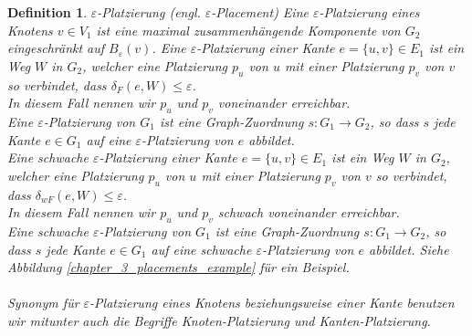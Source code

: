 \documentclass[a4paper, 12pt, twoside]{article}
\theoremstyle{Format1} %
\newtheorem{Def}{Definition}[section]       %
\begin{document}
\begin{Def}
	$\varepsilon$-Platzierung (engl. $\varepsilon$-Placement)
	Eine \textit{$\varepsilon$-Platzierung eines Knotens $v \in V_1$} ist eine maximal zusammenhängende Komponente von $G_2$ eingeschränkt auf $B_{\varepsilon}(v)$.
	Eine \textit{$\varepsilon$-Platzierung einer Kante $e = \{u,v\} \in E_1$} ist ein Weg $W$ in $G_2$, welcher eine Platzierung $p_u$ von $u$ mit einer Platzierung $p_v$ von $v$
	so verbindet, dass $\delta_F(e, W) \leq \varepsilon$.
	\\
	In diesem Fall nennen wir $p_u$ und $p_v$ \textit{voneinander erreichbar}.
	\\
	Eine \textit{$\varepsilon$-Platzierung von $G_1$} ist eine Graph-Zuordnung $s: G_1 \to G_2$, so dass $s$ jede Kante $e \in G_1$ auf eine $\varepsilon$-Platzierung von $e$ abbildet.
	\\
	Eine schwache $\varepsilon$-Platzierung einer Kante $e = \{u,v\} \in E_1$ ist ein Weg $W$ in $G_2$, welcher eine Platzierung $p_u$ von $u$ mit einer Platzierung $p_v$ von $v$
	so verbindet, dass $\delta_{wF}(e, W) \leq \varepsilon$.
	\\
	In diesem Fall nennen wir $p_u$ und $p_v$ \textit{schwach voneinander erreichbar}.
	\\
	Eine schwache \textit{$\varepsilon$-Platzierung von $G_1$} ist eine Graph-Zuordnung $s: G_1 \to G_2$, so dass $s$ jede Kante $e \in G_1$ auf eine schwache $\varepsilon$-Platzierung von $e$ abbildet.
	Siehe Abbildung \ref{chapter_3_placements_example} für ein Beispiel.
	\\
	\\
	Synonym für $\varepsilon$-Platzierung eines Knotens beziehungsweise einer Kante benutzen wir mitunter auch die Begriffe \textit{Knoten-Platzierung} und \textit{Kanten-Platzierung}.


\end{Def}
\end{document}
